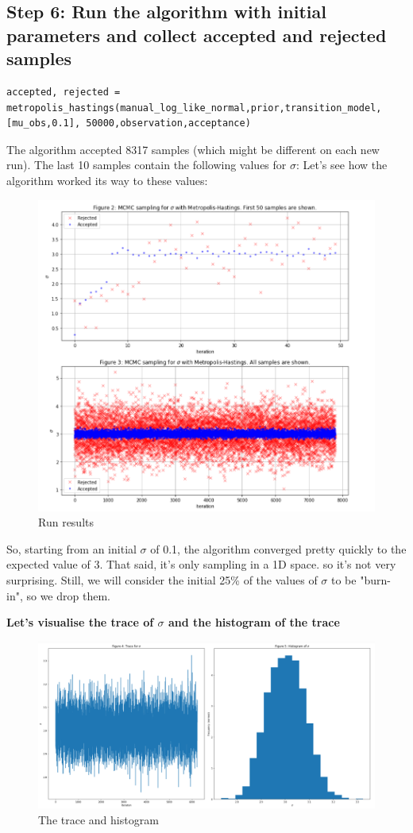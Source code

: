 \subsection{Step 6: Run the algorithm with initial parameters and collect accepted and rejected samples}

\begin{lstlisting}
accepted, rejected = metropolis_hastings(manual_log_like_normal,prior,transition_model,[mu_obs,0.1], 50000,observation,acceptance)
\end{lstlisting}

The algorithm accepted 8317 samples (which might be different on each new run). The last 10 samples contain the following values for $\sigma$:\newline
[2.87920187, 3.10388928, 2.94469786, 3.04094103, 2.95522153, 3.09328088, 3.07361275, 3.08588388, 3.12881964, 3.03651136]\newline
Let's see how the algorithm worked its way to these values:

\begin{figure}[h]
    \centering
\includegraphics[width=.6\textwidth]{pic/p05c08-snip03}
    \caption{Run results}
    \label{fig:p05c08-snip03}
\end{figure}

So, starting from an initial $\sigma$ of 0.1, the algorithm converged pretty quickly to the expected value of 3. That said, it's only sampling in a 1D space. so it's not very surprising.
Still, we will consider the initial 25\% of the values of $\sigma$ to be "burn-in", so we drop them.

\textbf{Let's visualise the trace of $\sigma$ and the histogram of the trace}


\begin{figure}[h]
    \centering
\includegraphics[width=.6\textwidth]{pic/p05c08-snip04}
    \caption{The trace and histogram}
    \label{fig:p05c08-snip04}
\end{figure}


